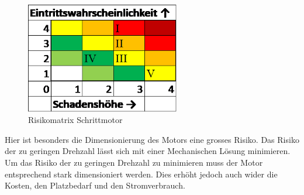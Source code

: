 \documentclass[../../main.tex]{subfiles}
\begin{document}
    \begin{figure}[H]
        \centering
        \includegraphics[width=0.6\textwidth]{Antr_Risiko_Schrittmotor.png}
        \caption {Risikomatrix Schrittmotor}
        \label{fig:antr_risikomatrix_schrittmotor}
    \end{figure}

    Hier ist besonders die Dimensionierung des Motors eine grosses Risiko. Das Risiko der zu geringen Drehzahl lässt sich mit einer Mechanischen Lösung  minimieren. Um das Risiko der zu geringen Drehzahl zu minimieren muss der Motor entsprechend stark dimensioniert werden. Dies erhöht jedoch auch wider die Kosten, den Platzbedarf und den Stromverbrauch.

    
\end{document}
